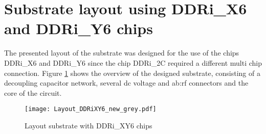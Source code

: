 \section{Substrate layout using DDRi\_X6 and DDRi\_Y6 chips}

The presented layout of the substrate was designed for the use of the chips DDRi\_X6 and DDRi\_Y6 since the chip DDRi\_2C required a different multi chip connection.
Figure \ref{fig:layoutDDRiXY6sub} shows the overview of the designed substrate, consisting of a decoupling capacitor network, several dc voltage and \gls{ab:rf} connectors and the core of the circuit.

\begin{figure}[htb!]
	\centering
  \texttt{[image: Layout\_DDRiXY6\_new\_grey.pdf]}
	\caption{Layout substrate with DDRi\_XY6 chips}
	\label{fig:layoutDDRiXY6sub}
\end{figure}



